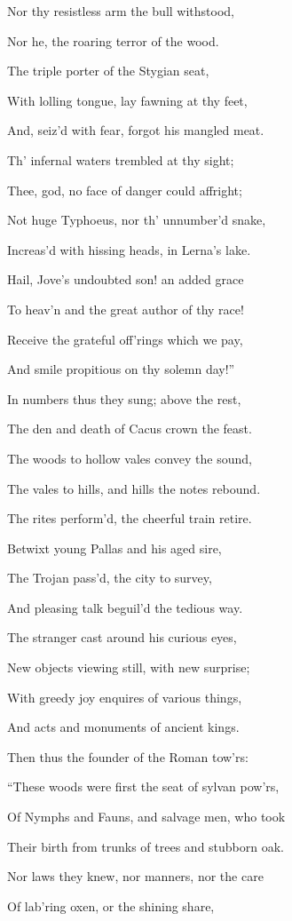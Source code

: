 Nor thy resistless arm the bull withstood,

Nor he, the roaring terror of the wood.

The triple porter of the Stygian seat,

With lolling tongue, lay fawning at thy feet,

And, seiz’d with fear, forgot his mangled meat.

Th’ infernal waters trembled at thy sight;

Thee, god, no face of danger could affright;

Not huge Typhoeus, nor th’ unnumber’d snake,

Increas’d with hissing heads, in Lerna’s lake.

Hail, Jove’s undoubted son! an added grace

To heav’n and the great author of thy race!

Receive the grateful off’rings which we pay,

And smile propitious on thy solemn day!”

In numbers thus they sung; above the rest,

The den and death of Cacus crown the feast.

The woods to hollow vales convey the sound,

The vales to hills, and hills the notes rebound.

The rites perform’d, the cheerful train retire.

Betwixt young Pallas and his aged sire,

The Trojan pass’d, the city to survey,

And pleasing talk beguil’d the tedious way.

The stranger cast around his curious eyes,

New objects viewing still, with new surprise;

With greedy joy enquires of various things,

And acts and monuments of ancient kings.

Then thus the founder of the Roman tow’rs:

“These woods were first the seat of sylvan pow’rs,

Of Nymphs and Fauns, and salvage men, who took

Their birth from trunks of trees and stubborn oak.

Nor laws they knew, nor manners, nor the care

Of lab’ring oxen, or the shining share,

